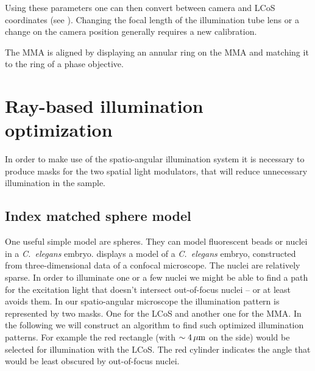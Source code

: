 Using these parameters one can then convert between camera and LCoS
coordinates (see ). Changing the focal
length of the illumination tube lens or a change on the camera position
generally requires a new calibration.


The MMA is aligned by displaying an annular ring on the MMA and
matching it to the ring of a phase objective.


\section{Ray-based illumination optimization}
In order to make use of the spatio-angular illumination system it is
necessary to produce masks for the two spatial light modulators, that
will reduce unnecessary illumination in the sample.

\subsection{Index matched sphere model}
\label{sec:shadow-map}
One useful simple model are spheres. They can model fluorescent beads
or nuclei in a \emph{C.~elegans} embryo.  displays
a model of a \emph{C.~elegans} embryo, constructed from
three-dimensional data of a confocal microscope. The nuclei are
relatively sparse. In order to illuminate one or a few nuclei we might
be able to find a path for the excitation light that doesn't intersect
out-of-focus nuclei -- or at least avoids them. In our spatio-angular
microscope the illumination pattern is represented by two masks. One
for the LCoS and another one for the MMA. In the following we will
construct an algorithm to find such optimized illumination
patterns. For example the red rectangle (with $\sim\unit[4]{\mu m}$ on
the side) would be selected for illumination with the LCoS. The red
cylinder indicates the angle that would be least obscured by
out-of-focus nuclei.


